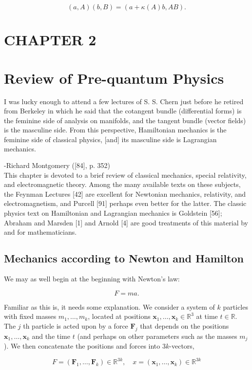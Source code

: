 \documentclass[10pt, letterpaper]{article}
\begin{document}
$$
(a, A)(b, B)=(a+\kappa(A) b, A B) .
$$

\section*{CHAPTER 2}
\section*{Review of Pre-quantum Physics}
\begin{displayquote}
I was lucky enough to attend a few lectures of S. S. Chern just before he retired from Berkeley in which he said that the cotangent bundle (differential forms) is the feminine side of analysis on manifolds, and the tangent bundle (vector fields) is the masculine side. From this perspective, Hamiltonian mechanics is the feminine side of classical physics, [and] its masculine side is Lagrangian mechanics.
\end{displayquote}

-Richard Montgomery ([84], p. 352)\\[0pt]
This chapter is devoted to a brief review of classical mechanics, special relativity, and electromagnetic theory. Among the many available texts on these subjects, the Feynman Lectures [42] are excellent for Newtonian mechanics, relativity, and electromagnetism, and Purcell [91] perhaps even better for the latter. The classic physics text on Hamiltonian and Lagrangian mechanics is Goldstein [56]; Abraham and Marsden [1] and Arnold [4] are good treatments of this material by and for mathematicians.

\subsection*{Mechanics according to Newton and Hamilton}
We may as well begin at the beginning with Newton's law:

$$
F=m a .
$$

Familiar as this is, it needs some explanation. We consider a system of $k$ particles with fixed masses $m_{1}, \ldots, m_{k}$, located at positions $\mathbf{x}_{1}, \ldots, \mathbf{x}_{k} \in \mathbb{R}^{3}$ at time $t \in \mathbb{R}$. The $j$ th particle is acted upon by a force $\mathbf{F}_{j}$ that depends on the positions $\mathbf{x}_{1}, \ldots, \mathbf{x}_{k}$ and the time $t$ (and perhaps on other parameters such as the masses $m_{j}$ ). We then concatenate the positions and forces into $3 k$-vectors,

$$
F=\left(\mathbf{F}_{1}, \ldots, \mathbf{F}_{k}\right) \in \mathbb{R}^{3 k}, \quad x=\left(\mathbf{x}_{1}, \ldots, \mathbf{x}_{k}\right) \in \mathbb{R}^{3 k}
$$
\end{document}
